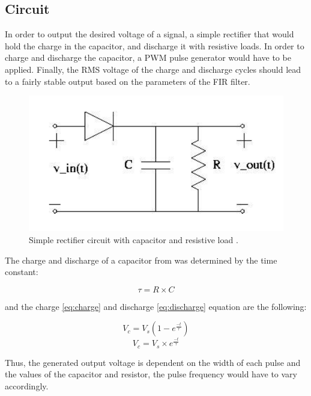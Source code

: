 \documentclass[a4paper,titlepage]{article}
\begin{document}
\subsection{Circuit}
In order to output the desired voltage of a signal, a simple rectifier that would hold the charge in the capacitor, and discharge it with resistive loads. In order to charge and discharge the capacitor, a PWM pulse generator would have to be applied. Finally, the RMS voltage of the charge and discharge cycles should lead to a fairly stable output based on the parameters of the FIR filter.

\begin{figure}[!htb]
  \centering
  \includegraphics[width=\columnwidth]{figures/rectifier_circuit.png}
  \caption{Simple rectifier circuit with capacitor and resistive load \cite{lab3_handout}.}
  \label{fig:rec_circuit}
\end{figure}

The charge and discharge of a capacitor from  was determined by the time constant:

\begin{equation}
\tau = R \times C
\label{eq:time_constant}
\end{equation}

and the charge \eqref{eq:charge} and discharge \eqref{eq:discharge} equation are the following:

\begin{equation}
V_c = V_s (1-e^\frac{-t}{\tau})
\label{eq:charge}
\end{equation}
\begin{equation}
 V_c = V_s \times e^\frac{-t}{\tau}
 \label{eq:discharge}
\end{equation}

Thus, the generated output voltage is dependent on the width of each pulse and the values of the capacitor and resistor, the pulse frequency would have to vary accordingly.
\end{document}

